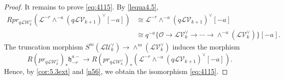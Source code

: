 \documentclass[10pt,a4paper]{amsart}
\newcommand\mc{\mathcal}
\newcommand\mf{\mathfrak}
\begin{document}
\begin{proof}
It remains to prove \cref{eq:4115}. By \cref{lequa4.5},
  \begin{align*}
    Rpr_{q\mc{L}\mc{W}_{k}^{\vee}}(\mc{L}^{-r}\wedge^{-a}(q\mc{L}\mc{V}_{k+1})^{\vee}[-a])&\cong \mc{L}^{-r}\wedge^{-a}(q\mc{L}\mc{V}_{k+1})^{\vee}[-a] \\
    &\cong q^{-a}\{\mc{O}\to \mc{L}\mc{V}_{k}^{\vee}\to \cdots \to \wedge^{-a}(\mc{L}\mc{V}_{k}^{\vee})\}[-a].
  \end{align*}
The truncation morphism $S^{m}(\mc{L}\mc{U}_{k}^{\vee})\to \wedge^{m}(\mc{L}\mc{V}_{k}^{\vee})$
  induces the morphism
  $$R(pr_{q\mc{L}\mc{W}_{k}^{\vee}})_{*}\mf{h}_{-r}^{a-}\to R(pr_{q\mc{L}\mc{W}_{k}^{\vee}})_{*}(\mc{L}^{-r}\wedge^{-a}(q\mc{L}\mc{V}_{k+1})^{\vee}[-a]).$$
Hence, by \cref{cor:5.3ext} and \cref{n56}, we obtain the isomorphism \cref{eq:4115}.
\end{proof}
\end{document}
